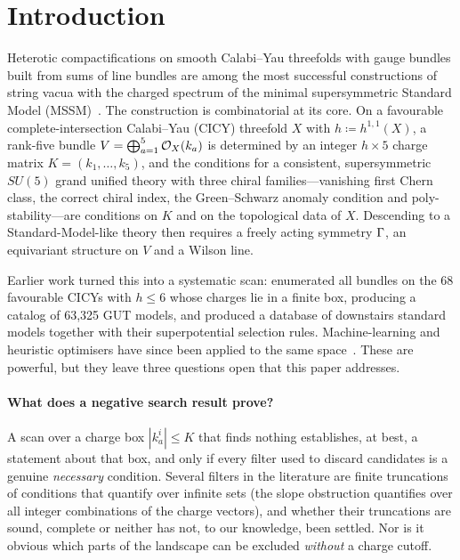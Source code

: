 \section{Introduction}
\label{sec:intro}

Heterotic compactifications on smooth Calabi--Yau threefolds with gauge bundles
built from sums of line bundles are among the most successful constructions of
string vacua with the charged spectrum of the minimal supersymmetric Standard
Model (MSSM)~\cite{AGLP2011,AGLP2012,ACGLP2013}. The construction is
combinatorial at its core. On a favourable complete-intersection Calabi--Yau
(CICY) threefold $X$ with $h\coloneqq h^{1,1}(X)$, a rank-five bundle
$V=\bigoplus_{a=1}^{5}\mathcal{O}_X(k_a)$ is determined by an integer $h\times 5$ charge
matrix $K=(k_1,\dots,k_5)$, and the conditions for a consistent, supersymmetric
$SU(5)$ grand unified theory with three chiral families---vanishing first Chern
class, the correct chiral index, the Green--Schwarz anomaly condition and
poly-stability---are conditions on $K$ and on the topological data of $X$.
Descending to a Standard-Model-like theory then requires a freely acting
symmetry $\Gamma$, an equivariant structure on $V$ and a Wilson line.

Earlier work turned this into a systematic scan: \cite{ACGLP2013} enumerated all
bundles on the 68 favourable CICYs with $h\le 6$ whose charges lie in a finite
box, producing a catalog of 63,325 GUT models, and \cite{AGLP2011,AGLP2012}
produced a database of downstairs standard models together with their
superpotential selection rules. Machine-learning and heuristic optimisers have
since been applied to the same space~\cite{ACHLN2023}. These are powerful, but
they leave three questions open that this paper addresses.

\paragraph{What does a negative search result prove?} A scan over a charge box
$|k_a^i|\le K$ that finds nothing establishes, at best, a statement about that
box, and only if every filter used to discard candidates is a genuine
\emph{necessary} condition. Several filters in the literature are finite
truncations of conditions that quantify over infinite sets (the slope
obstruction quantifies over all integer combinations of the charge vectors), and
whether their truncations are sound, complete or neither has not, to our
knowledge, been settled. Nor is it obvious which parts of the landscape can be
excluded \emph{without} a charge cutoff.

